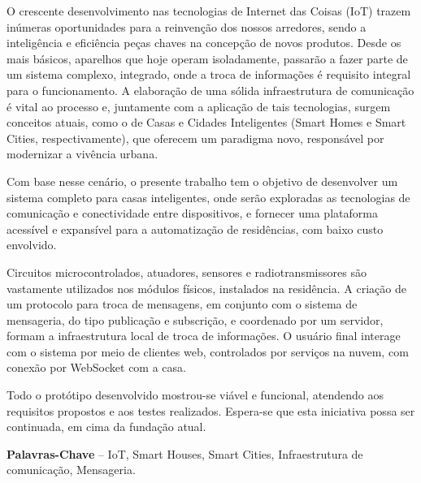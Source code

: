 
\begin{resumo}
%
O crescente desenvolvimento nas tecnologias de Internet das Coisas (IoT) trazem inúmeras oportunidades para a reinvenção dos nossos arredores, sendo a inteligência e eficiência peças chaves na concepção de novos produtos. Desde os mais básicos, aparelhos que hoje operam isoladamente, passarão a fazer parte de um sistema complexo, integrado, onde a troca de informações é requisito integral para o funcionamento. A elaboração de uma sólida infraestrutura de comunicação é vital ao processo e, juntamente com a aplicação de tais tecnologias, surgem conceitos atuais, como o de Casas e Cidades Inteligentes (Smart Homes e Smart Cities, respectivamente), que oferecem um paradigma novo, responsável por modernizar a vivência urbana.

Com base nesse cenário, o presente trabalho tem o objetivo de desenvolver um sistema completo para casas inteligentes, onde serão exploradas as tecnologias de comunicação e conectividade entre dispositivos, e fornecer uma plataforma acessível e expansível para a automatização de residências, com baixo custo envolvido.

Circuitos microcontrolados, atuadores, sensores e radiotransmissores são vastamente utilizados nos módulos físicos, instalados na residência. A criação de um protocolo para troca de mensagens, em conjunto com o sistema de mensageria, do tipo publicação e subscrição, e coordenado por um servidor, formam a infraestrutura local de troca de informações. O usuário final interage com o sistema por meio de clientes web, controlados por serviços na nuvem, com conexão por WebSocket com a casa.

Todo o protótipo desenvolvido mostrou-se viável e funcional, atendendo aos requisitos propostos e aos testes realizados. Espera-se que esta iniciativa possa ser continuada, em cima da fundação atual.

%
\textbf{Palavras-Chave} -- IoT, Smart Houses, Smart Cities, Infraestrutura de comunicação, Mensageria.
\end{resumo}
